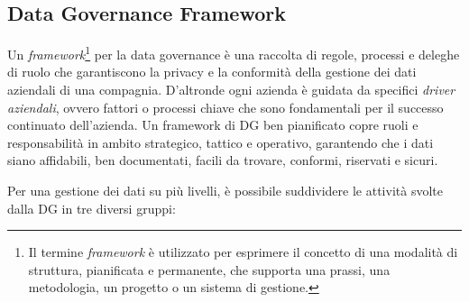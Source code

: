 \subsection{Data Governance Framework}

Un \textit{framework}\footnote{Il termine \textit{framework} è utilizzato per esprimere il concetto di una modalità di struttura, pianificata e permanente, che supporta una prassi, una metodologia, un progetto o un sistema di gestione.\cite{wikipedia_framework_definition}} per la data governance è una raccolta di regole, processi e deleghe di ruolo che garantiscono la privacy e la conformità della gestione dei dati aziendali di una compagnia. D'altronde ogni azienda è guidata da specifici \textit{driver aziendali}, ovvero fattori o processi chiave che sono fondamentali per il successo continuato dell'azienda. Un framework di DG ben pianificato copre ruoli e responsabilità in ambito strategico, tattico e operativo, garantendo che i dati siano affidabili, ben documentati, facili da trovare, conformi, riservati e sicuri.\cite{talend_data_governance_framework}

Per una gestione dei dati su più livelli, è possibile suddividere le attività svolte dalla DG in tre diversi gruppi:\cite{sadas_data_governance_strategy}


